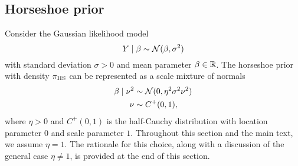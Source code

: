 \subsection{Horseshoe prior}
\label{sec:app:backgroundhorseshoe}
Consider the Gaussian likelihood model
$$
    Y\mid \beta\sim \mathcal N(\beta,\sigma^2)
$$
with standard deviation $\sigma>0$ and mean parameter $\beta\in\mathbb R$. The horseshoe prior~\citep{Carvalho2010} with density $\pi_{\mathrm{HS}}$ can be represented as a scale mixture of normals \citep{Andrews1974}
\begin{align}
    \beta\mid \nu^2 &\sim \mathcal N(0,\eta^2\sigma^2\nu^2)\\
    \nu &\sim C^+(0,1),
\end{align}
where $\eta>0$ and $C^+(0,1)$ is the half-Cauchy distribution with location parameter $0$ and scale parameter $1$. Throughout this section and the main text, we assume $\eta=1$. The rationale for this choice, along with a discussion of the general case $\eta\neq 1$, is provided at the end of this section.

